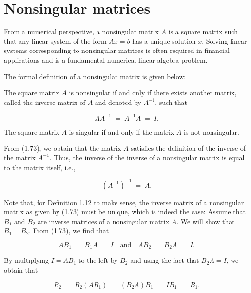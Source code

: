
\section{Nonsingular matrices}

From a numerical perspective, a nonsingular matrix $A$ is a square matrix
such that any linear system of the form $Ax=b$ has a unique solution $x$.
Solving linear systems corresponding to nonsingular matrices is often
required in financial applications and is a fundamental numerical linear
algebra problem.

The formal definition of a nonsingular matrix is given below:

\begin{definition}
The square matrix $A$ is nonsingular if and only if there exists another
matrix, called the inverse matrix of $A$ and denoted by $A^{-1}$, such
that

\begin{equation}
AA^{-1} \;=\; A^{-1}A \;=\; I.
\end{equation}
\end{definition}

\begin{definition}
The square matrix $A$ is singular if and only if the matrix $A$ is not
nonsingular.
\end{definition}

From (1.73), we obtain that the matrix $A$ satisfies the definition of the
inverse of the matrix $A^{-1}$. Thus, the inverse of the inverse of a
nonsingular matrix is equal to the matrix itself, i.e.,

\begin{equation}
\left(A^{-1}\right)^{-1} \;=\; A.
\end{equation}

Note that, for Definition 1.12 to make sense, the inverse matrix of a
nonsingular matrix as given by (1.73) must be unique, which is indeed the
case: Assume that $B_1$ and $B_2$ are inverse matrices of a nonsingular
matrix $A$. We will show that $B_1=B_2$. From (1.73), we find that

\[
AB_1 \;=\; B_1A \;=\; I \quad\text{and}\quad AB_2 \;=\; B_2A \;=\; I.
\]

By multiplying $I=AB_1$ to the left by $B_2$ and using the fact that
$B_2A=I$, we obtain that

\[
B_2 \;=\; B_2(AB_1) \;=\; (B_2A)B_1 \;=\; IB_1 \;=\; B_1.
\]

